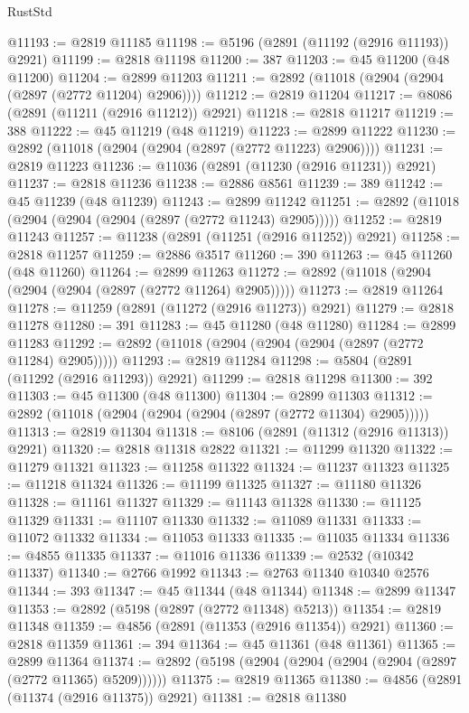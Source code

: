 \begin{lexlean}{RustStd}
\begin{coremodule}
@11193 := @2819 @11185
@11198 := @5196 (@2891 (@11192 (@2916 @11193)) @2921)
@11199 := @2818 @11198
@11200 := 387
@11203 := @45 @11200 (@48 @11200)
@11204 := @2899 @11203
@11211 := @2892 (@11018 (@2904 (@2904 (@2897 (@2772 @11204) @2906))))
@11212 := @2819 @11204
@11217 := @8086 (@2891 (@11211 (@2916 @11212)) @2921)
@11218 := @2818 @11217
@11219 := 388
@11222 := @45 @11219 (@48 @11219)
@11223 := @2899 @11222
@11230 := @2892 (@11018 (@2904 (@2904 (@2897 (@2772 @11223) @2906))))
@11231 := @2819 @11223
@11236 := @11036 (@2891 (@11230 (@2916 @11231)) @2921)
@11237 := @2818 @11236
@11238 := @2886 @8561
@11239 := 389
@11242 := @45 @11239 (@48 @11239)
@11243 := @2899 @11242
@11251 := @2892 (@11018 (@2904 (@2904 (@2904 (@2897 (@2772 @11243) @2905)))))
@11252 := @2819 @11243
@11257 := @11238 (@2891 (@11251 (@2916 @11252)) @2921)
@11258 := @2818 @11257
@11259 := @2886 @3517
@11260 := 390
@11263 := @45 @11260 (@48 @11260)
@11264 := @2899 @11263
@11272 := @2892 (@11018 (@2904 (@2904 (@2904 (@2897 (@2772 @11264) @2905)))))
@11273 := @2819 @11264
@11278 := @11259 (@2891 (@11272 (@2916 @11273)) @2921)
@11279 := @2818 @11278
@11280 := 391
@11283 := @45 @11280 (@48 @11280)
@11284 := @2899 @11283
@11292 := @2892 (@11018 (@2904 (@2904 (@2904 (@2897 (@2772 @11284) @2905)))))
@11293 := @2819 @11284
@11298 := @5804 (@2891 (@11292 (@2916 @11293)) @2921)
@11299 := @2818 @11298
@11300 := 392
@11303 := @45 @11300 (@48 @11300)
@11304 := @2899 @11303
@11312 := @2892 (@11018 (@2904 (@2904 (@2904 (@2897 (@2772 @11304) @2905)))))
@11313 := @2819 @11304
@11318 := @8106 (@2891 (@11312 (@2916 @11313)) @2921)
@11320 := @2818 @11318 @2822
@11321 := @11299 @11320
@11322 := @11279 @11321
@11323 := @11258 @11322
@11324 := @11237 @11323
@11325 := @11218 @11324
@11326 := @11199 @11325
@11327 := @11180 @11326
@11328 := @11161 @11327
@11329 := @11143 @11328
@11330 := @11125 @11329
@11331 := @11107 @11330
@11332 := @11089 @11331
@11333 := @11072 @11332
@11334 := @11053 @11333
@11335 := @11035 @11334
@11336 := @4855 @11335
@11337 := @11016 @11336
@11339 := @2532 (@10342 @11337)
@11340 := @2766 @1992
@11343 := @2763 @11340 @10340 @2576
@11344 := 393
@11347 := @45 @11344 (@48 @11344)
@11348 := @2899 @11347
@11353 := @2892 (@5198 (@2897 (@2772 @11348) @5213))
@11354 := @2819 @11348
@11359 := @4856 (@2891 (@11353 (@2916 @11354)) @2921)
@11360 := @2818 @11359
@11361 := 394
@11364 := @45 @11361 (@48 @11361)
@11365 := @2899 @11364
@11374 := @2892 (@5198 (@2904 (@2904 (@2904 (@2904 (@2897 (@2772 @11365) @5209))))))
@11375 := @2819 @11365
@11380 := @4856 (@2891 (@11374 (@2916 @11375)) @2921)
@11381 := @2818 @11380

\end{coremodule}
\end{lexlean}
